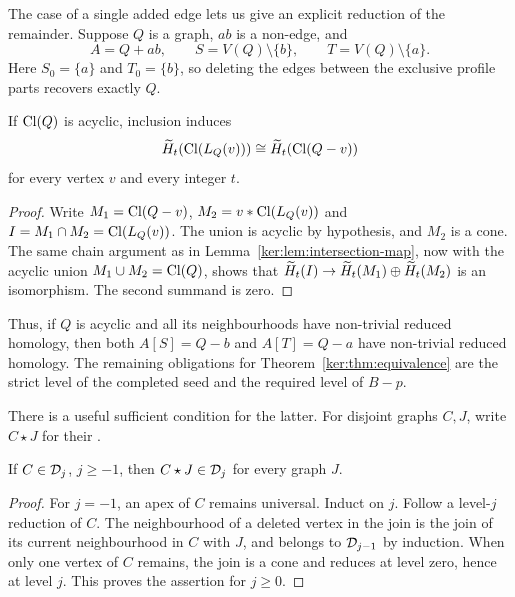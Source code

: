 The case of a single added edge lets us give an explicit reduction of the remainder. Suppose \(Q\) is a graph, \(ab\) is a non-edge, and
\[
 A=Q+ab,\qquad S=V(Q)\setminus\{b\},\qquad
 T=V(Q)\setminus\{a\}.
\]
Here \(S_0=\{a\}\) and \(T_0=\{b\}\), so deleting the edges between
the exclusive profile parts recovers exactly \(Q\).

\begin{lemma}\label{ker:lem:delete-vertex}
If \(\operatorname{Cl}(Q)\) is acyclic, inclusion induces
\[
 \widetilde H_t(\operatorname{Cl}(L_Q(v)))\cong\widetilde H_t(\operatorname{Cl}(Q-v))
\]
for every vertex \(v\) and every integer \(t\).
\end{lemma}
\begin{proof}
Write \(M_1=\operatorname{Cl}(Q-v)\), \(M_2=v*\operatorname{Cl}(L_Q(v))\) and
\(I=M_1\cap M_2=\operatorname{Cl}(L_Q(v))\). The union is acyclic by hypothesis,
and \(M_2\) is a cone. The same chain argument as in
Lemma~\ref{ker:lem:intersection-map}, now with the acyclic union
\(M_1\cup M_2=\operatorname{Cl}(Q)\), shows that
\(\widetilde H_t(I)\to\widetilde H_t(M_1)\oplus\widetilde H_t(M_2)\) is an isomorphism.
The second summand is zero.
\end{proof}

Thus, if \(Q\) is acyclic and all its neighbourhoods have
non-trivial reduced homology, then both \(A[S]=Q-b\) and
\(A[T]=Q-a\) have non-trivial reduced homology.
The remaining obligations for
Theorem~\ref{ker:thm:equivalence} are the strict level of the completed
seed and the required level of \(B-p\).

There is a useful sufficient condition for the latter.
For disjoint graphs \(C,J\), write \(C\star J\) for their
.

\begin{lemma}\label{ker:lem:join}
If \(C\in\mathcal D_j\), \(j\geq-1\), then
\(C\star J\in\mathcal D_j\) for every graph \(J\).
\end{lemma}
\begin{proof}
For \(j=-1\), an apex of \(C\) remains universal.
Induct on \(j\). Follow a level-\(j\) reduction of \(C\).
The neighbourhood of a deleted vertex in the join is the join
of its current neighbourhood in \(C\) with \(J\), and belongs
to \(\mathcal D_{j-1}\) by induction. When only one vertex of \(C\)
remains, the join is a cone and reduces at level zero, hence at
level \(j\). This proves the assertion for \(j\geq0\).
\end{proof}

